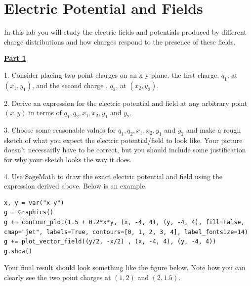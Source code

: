 \section{Electric Potential and Fields}

In this lab you will study the electric fields and potentials produced by different charge distributions and how charges respond to the presence of these fields.

\vspace{\baselineskip}

\underline{\textbf{Part 1}} \par
1. Consider placing two point charges on an x-y plane, the first charge, $q_1$, at $(x_1, y_1)$, and the second charge , $q_2$, at $(x_2, y_2)$.

\vspace{\baselineskip}

2. Derive an expression for the electric potential and field at any arbitrary point $(x, y)$ in terms of $q_1, q_2, x_1, x_2, y_1$ and $y_2$.

\vspace{\baselineskip}

3. Choose some reasonable values for $q_1, q_2, x_1, x_2, y_1$ and $y_2$ and make a rough sketch of what you expect the electric potential/field to look like.
Your picture doesn't necessarily have to be correct, but you should include some justification for why your sketch looks the way it does.

\vspace{\baselineskip}

4. Use SageMath to draw the exact electric potential and field using the expression derived above.
Below is an example.

\begin{verbatim}
x, y = var("x y")
g = Graphics()
g += contour_plot(1.5 + 0.2*x*y, (x, -4, 4), (y, -4, 4), fill=False, cmap="jet", labels=True, contours=[0, 1, 2, 3, 4], label_fontsize=14)
g += plot_vector_field((y/2, -x/2) , (x, -4, 4), (y, -4, 4)) 
g.show()
\end{verbatim}

Your final result should look something like the figure below.
Note how you can clearly see the two point charges at $(1, 2)$ and $(2, 1.5)$.

